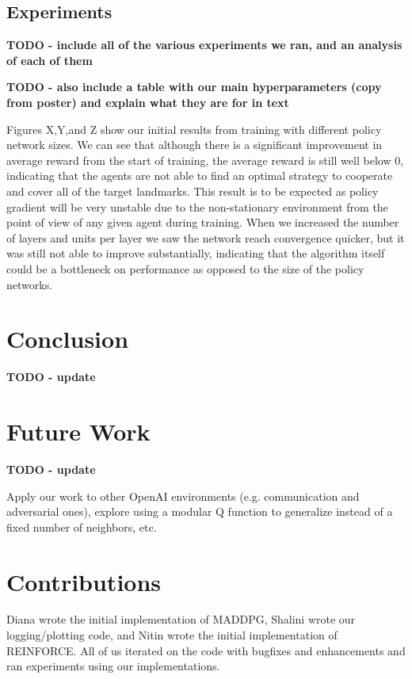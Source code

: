 \documentclass{article}
\begin{document}
\subsection{Experiments}

\textbf{TODO - include all of the various experiments we ran, and an analysis of each of them}

\textbf{TODO - also include a table with our main hyperparameters (copy from poster) and explain what they are for in text}

Figures X,Y,and Z show our initial results from training with different policy network sizes. We can see that although there is a significant improvement in average reward from the start of training, the average reward is still well below 0, indicating that the agents are not able to find an optimal strategy to cooperate and cover all of the target landmarks. This result is to be expected as policy gradient will be very unstable due to the non-stationary environment from the point of view of any given agent during training. When we increased the number of layers and units per layer we saw the network reach convergence quicker, but it was still not able to improve substantially, indicating that the algorithm itself could be a bottleneck on performance as opposed to the size of the policy networks.

\section{Conclusion}
\textbf{TODO - update}

\section{Future Work}
\textbf{TODO - update}

Apply our work to other OpenAI environments (e.g. communication and adversarial ones), explore using a modular Q function to generalize instead of a fixed number of neighbors, etc.

\section*{Contributions}
Diana wrote the initial implementation of MADDPG, Shalini wrote our logging/plotting code, and Nitin wrote the initial implementation of REINFORCE. All of us iterated on the code with bugfixes and enhancements and ran experiments using our implementations.



\end{document}
